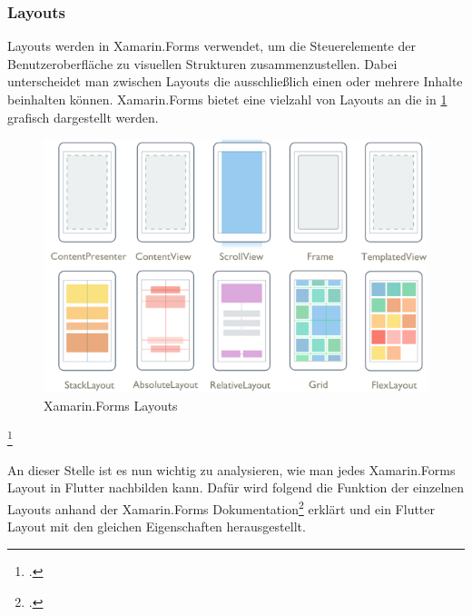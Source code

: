 \begin{minipage}{\linewidth}

\end{minipage}

\subsubsection{Layouts}

Layouts werden in Xamarin.Forms verwendet, um die Steuerelemente der Benutzeroberfläche zu visuellen Strukturen zusammenzustellen.  Dabei unterscheidet man zwischen Layouts die ausschließlich einen oder mehrere Inhalte beinhalten können.  Xamarin.Forms bietet eine vielzahl von Layouts an die in \ref{fig:Xamarin.Forms Layouts} grafisch dargestellt werden.

\begin{figure}[!ht]
 \includegraphics[width=\textwidth,height=\textheight,keepaspectratio]{Images/CrossPlattformFrameworks/XamarinFormsLayouts.png}
 \caption[Xamarin.Forms Layouts]{Xamarin.Forms Layouts\footnotemark}
 \label{fig:Xamarin.Forms Layouts}
\end{figure}
\footcitetext[Abbildung in Anlehnung an ][Abgerufen am \today]{MicrosoftXamLayouts2018}

An dieser Stelle ist es nun wichtig zu analysieren,  wie man jedes Xamarin.Forms Layout in Flutter nachbilden kann.  Dafür wird folgend die Funktion der einzelnen Layouts anhand der Xamarin.Forms Dokumentation\footcite[Vgl.][Abgerufen am \today]{MicrosoftXamLayouts2018} erklärt und ein Flutter Layout mit den gleichen Eigenschaften herausgestellt. 

